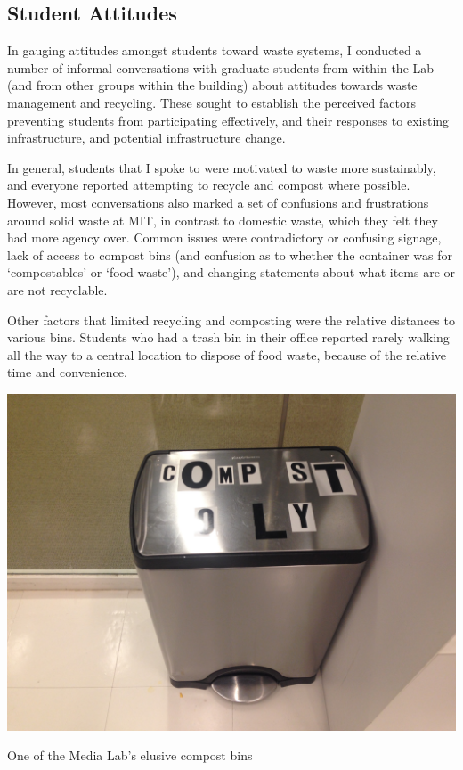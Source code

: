 \documentclass[nofonts,nols,justified,nobib]{tufte-book}
\begin{document}
\subsection*{Student Attitudes}

In gauging attitudes amongst students toward waste systems, I conducted a number of informal conversations with graduate students from within the Lab (and from other groups within the building) about attitudes towards waste management and recycling. These sought to establish the perceived factors preventing students from participating effectively, and their responses to existing infrastructure, and potential infrastructure change.

In general, students that I spoke to were motivated to waste more sustainably, and everyone reported attempting to recycle and compost where possible. However, most conversations also marked a set of confusions and frustrations around solid waste at MIT, in contrast to domestic waste, which they felt they had more agency over. Common issues were contradictory or confusing signage, lack of access to compost bins (and confusion as to whether the container was for `compostables' or `food waste'), and changing statements about what items are or are not recyclable.

Other factors that limited recycling and composting were the relative distances to various bins. Students who had a trash bin in their office reported rarely walking all the way to a central location to dispose of food waste, because of the relative time and convenience.

\begin{marginfigure}
  \includegraphics[width=1\linewidth]{img/2/mit-bins/compost1.JPG}
    \caption{One of the Media Lab's elusive compost bins}
\end{marginfigure}
\end{document}
